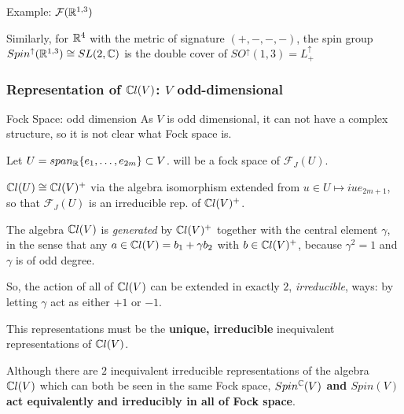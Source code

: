 \begin{frame}{Example: $\mathcal F(\mathbb R^{1, 3})$} %
    
    Similarly, for $\mathbb R^4$ with the metric of signature $(+, -, -, -)$, the spin group $Spin^\uparrow(\mathbb R^{1, 3}) \cong SL(2, \mathbb C)$ is the double cover of $SO^\uparrow(1, 3) = L^\uparrow_+$
    
\end{frame}

\subsubsection{Representation of $\mathbb C l(V)$: $V$ odd-dimensional}

\begin{frame}{Fock Space: odd dimension} %
    As $V$ is odd dimensional, it can not have a complex structure, so it is not clear what Fock space is.
    
    Let $U = span_\mathbb R\{e_1, \dots, e_{2m}\} \subset V$.  will be a fock space of $\mathcal F_J(U)$.
    
    $\mathbb C l(U) \cong \mathbb C l(V)^+$ via the algebra isomorphism extended from $u \in U \mapsto iue_{2m+1}$, so that $\mathcal F_J(U)$ is an irreducible rep. of $\mathbb C l(V)^+$.
    
    The algebra $\mathbb C l(V)$ is \emph{generated} by $\mathbb C l(V)^+$ together with the central element $\gamma$, in the sense that any $a \in \mathbb C l(V) = b_1 + \gamma b_2$ with $b \in \mathbb C l(V)^+$, because $\gamma^2 = 1$ and $\gamma$ is of odd degree.
    

\end{frame}

\begin{frame} %
    So, the action of all of $\mathbb C l(V)$ can be extended in exactly $2$, \emph{irreducible}, ways: by letting $\gamma$ act as either $+1$ or $-1$. 
    
    This representations must be the \textbf{unique, irreducible} inequivalent representations of $\mathbb C l(V)$.    
    
    Although there are $2$ inequivalent irreducible representations of the algebra $\mathbb C l(V)$ which can both be seen in the same Fock space, \textbf{$Spin^\mathbb C(V)$ and $Spin(V)$ act equivalently and irreducibly in all of Fock space}.
    
\end{frame}

